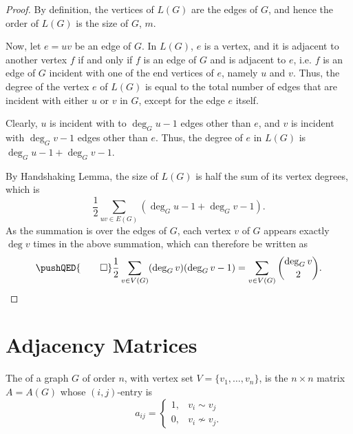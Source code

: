 \begin{proof}
By definition, the vertices of $L(G)$ are the edges of $G$, and hence the order of $L(G)$ is the size of $G$, $m$.

Now, let $e = uv$ be an edge of $G$. In $L(G)$, $e$ is a vertex, and it is adjacent to another vertex $f$ if and only if $f$ is an edge of $G$ and is adjacent to $e$, i.e. $f$ is an edge of $G$ incident with one of the end vertices of $e$, namely $u$ and $v$. Thus, the degree of the vertex $e$ of $L(G)$ is equal to the total number of edges that are incident with either $u$ or $v$ in $G$, except for the edge $e$ itself.

Clearly, $u$ is incident with to $\deg_G u - 1$ edges other than $e$, and $v$ is incident with $\deg_G v - 1$ edges other than $e$. Thus, the degree of $e$ in $L(G)$ is $\deg_G u  - 1 + \deg_G v - 1$.

By Handshaking Lemma, the size of $L(G)$ is half the sum of its vertex degrees, which is
\begin{equation*}
	\frac 1 2 \sum_{uv \in E(G)} (\deg_G u - 1 + \deg_G v - 1).
\end{equation*}
As the summation is over the edges of $G$, each vertex $v$ of $G$ appears exactly $\deg v$ times in the above summation, which can therefore be written as
\begin{equation*}
	\pushQED{\qed}
	\frac 1 2 \sum_{v \in V(G)} (\deg_G v)(\deg_G v - 1) = \sum_{v \in V(G)} \binom{\deg_G v}{2}.\qedhere
\end{equation*}
\end{proof}

\section{Adjacency Matrices}\label{sec:AdjMat}

The  of a graph $G$ of order $n$, with vertex set $V = \{v_1, \ldots, v_n\}$, is the $n \times n$ matrix $A = A(G)$ whose $(i,j)$-entry is
\begin{equation*}
a_{ij} = \begin{cases}
1, & v_i \sim v_j \\
0, & v_i \nsim v_j.
\end{cases}
\end{equation*}

